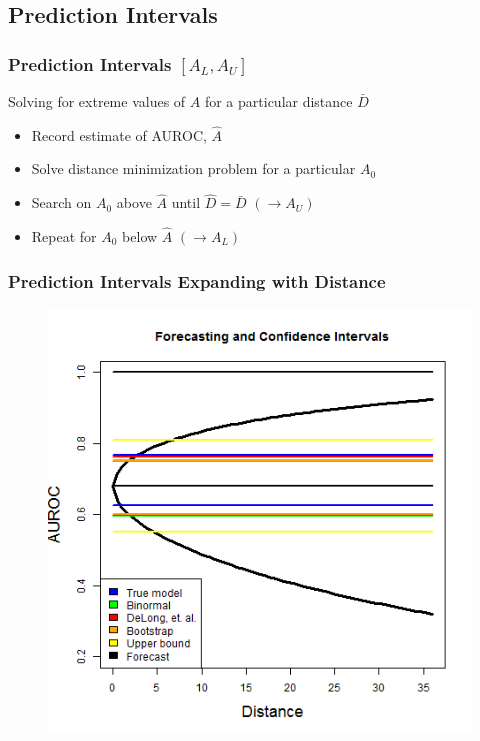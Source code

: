 \documentclass{beamer}
\begin{document}


\subsection{Prediction Intervals}



\begin{frame}
\frametitle{Prediction Intervals $[A_L, A_U]$}

Solving for extreme values of $A$ for a particular distance $\bar{D}$
\begin{itemize}
    \item Record estimate of AUROC, $\hat{A}$
    \item Solve distance minimization problem for a particular $A_0$
    \item Search on $A_0$ above $\hat{A}$ until $\hat{D} = \bar{D}$ $(\rightarrow A_U)$
    \item Repeat for $A_0$ below $\hat{A}$ $(\rightarrow A_L)$
\end{itemize}

\end{frame}


\begin{frame}
\frametitle{Prediction Intervals Expanding with Distance}

\vspace*{-0.25cm}
\begin{figure}
    \includegraphics[scale =  0.4 ]{Figs/Forecast_int_1.png}
\end{figure}

\end{frame}
\end{document}
